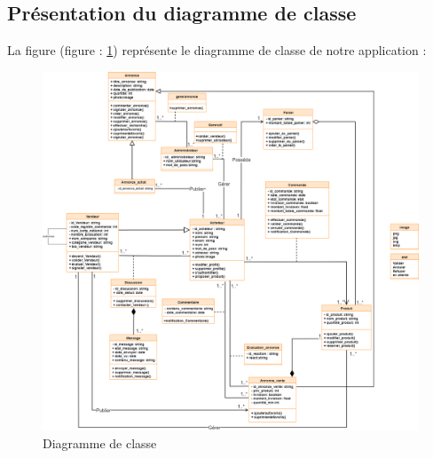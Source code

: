 \documentclass[edit,12pt,a4paper,ChapStyle,oneside,doubleinterligne]{report}
\begin{document}
\subsection{Présentation du diagramme de classe}
La figure (figure : \ref{fig:diag_class}) représente le diagramme de classe de notre application :
\begin{figure}[h!]
\centering
\includegraphics[width=1\textwidth]{images/diagramme de class.png}
\caption{Diagramme de classe}
\label{fig:diag_class}
\end{figure}
\end{document}
